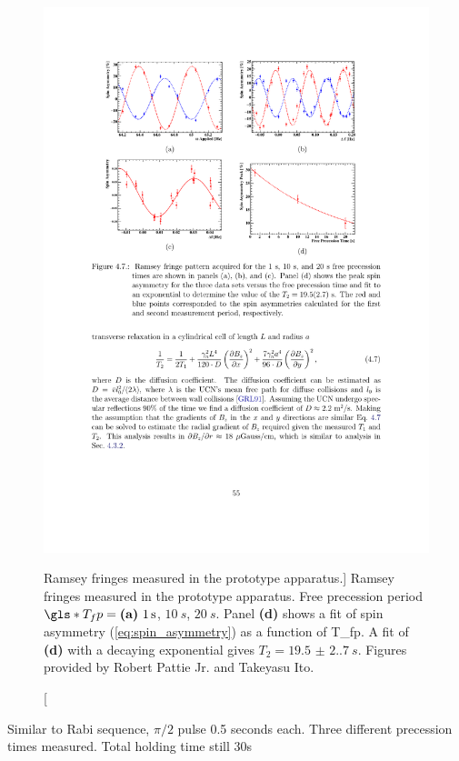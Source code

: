 \begin{figure}
    \centering
    \includegraphics[width=\textwidth]{figures/2017_ramsey_fringes.pdf}
    \caption
    [Ramsey fringes measured in the prototype apparatus.]
    {Ramsey fringes measured in the prototype apparatus. Free precession period $\gls*{T_fp}=\text{\textbf{(a)} }\qty{1}{s}$, $\qty{10}{s}$, $\qty{20}{s}$. Panel \textbf{(d)} shows a fit of spin asymmetry (\ref{eq:spin_asymmetry}) as a function of \gls*{T_fp}. A fit of \textbf{(d)} with a decaying exponential gives $T_2=\qty{19.5(2.7)}{s}$. Figures provided by Robert Pattie Jr. and Takeyasu Ito.}
    \label{fig:ramsey_fringes_2017}
\end{figure}

Similar to Rabi sequence, $\pi/2$ pulse 0.5 seconds each. Three different precession times measured. Total holding time still 30s

